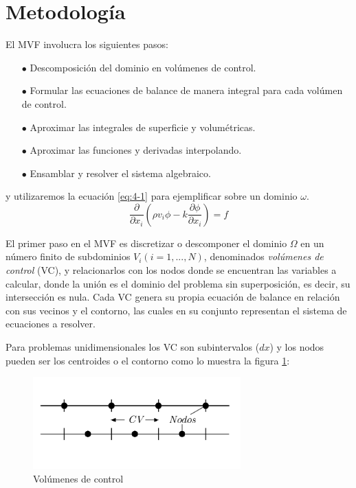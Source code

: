 \documentclass[a4paper,10pt, oneside]{book}
\begin{document}
\section{Metodología}

El MVF involucra los siguientes pasos:
\begin{itemize} 
	\item[$\bullet$] Descomposición del dominio en volúmenes de control.
	\item[$\bullet$] Formular las ecuaciones de balance de manera integral para cada volúmen de control.
	\item[$\bullet$] Aproximar las integrales de superficie y volumétricas.
	\item[$\bullet$] Aproximar las funciones y derivadas interpolando.
	\item[$\bullet$] Ensamblar y resolver el sistema algebraico.
\end{itemize}
y utilizaremos la ecuación \ref{eq:4-1} para ejemplificar sobre un dominio $\omega$.
\begin{equation}
	\frac{\partial}{\partial x_i} \left( \rho v_i \phi - k \frac{\partial \phi}{\partial x_i} \right) = f
	\label{eq:4-1}
\end{equation}

El primer paso en el MVF es discretizar o descomponer el dominio $\Omega$ en un número finito de subdominios $V_i (i=1,...,N)$, denominados \textit{volúmenes de control} (VC), y relacionarlos con los nodos donde se encuentran las variables a calcular, donde la unión es el dominio del problema sin superposición, es decir, su intersección es nula. Cada VC genera su propia ecuación de balance en relación con sus vecinos y el contorno, las cuales en su conjunto representan el sistema de ecuaciones a resolver.

Para problemas unidimensionales los VC son subintervalos ($dx$) y los nodos pueden ser los centroides o el contorno como lo muestra la figura \ref{img:4-1}:
\begin{figure}[h!]
	\centering
	\includegraphics[width=8cm]{Img/4-1}
	\caption{Volúmenes de control}
	\label{img:4-1}
\end{figure}
\end{document}
